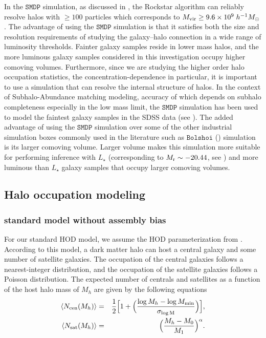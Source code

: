 \documentclass[12pt, preprint]{aastex}
\begin{document}
In the $\mathtt{SMDP}$ simulation, as discussed in \citet{halodemographic}, the Rockstar algorithm can reliably resolve halos with $\geq 100$ particles which corresponds to $M_{\rm vir} \geq 9.6 \times 10^{9} \; h^{-1}M_{\odot}$. The advantage of using the $\mathtt{SMDP}$ simulation is that it satisfies both the size and resolution requirements of studying the galaxy--halo connection in a wide range of luminosity thresholds. Fainter galaxy samples reside in lower mass halos, and the more luminous galaxy samples considered in this investigation occupy higher comoving volumes. Furthermore, since we are studying the higher order halo occupation statistics, the concentration-dependence in particular, it is important to use a simulation that can resolve the internal structure of halos. In the context of Subhalo-Abundance matching modeling, accuracy of which depends on subhalo completeness especially in the low mass limit, the $\mathtt{SMDP}$ simulation has been used to model the faintest galaxy samples in the SDSS data (see \citet{hod_vs_sham}). The added advantage of using the $\mathtt{SMDP}$ simulation over some of the other industrial simulation boxes commonly used in the literature such as $\mathtt{Bolshoi}$ (\citealt{Klypin2011,smallmultidark}) simulation is its larger comoving volume. Larger volume makes this simulation more suitable for performing inference with $L_{\star}$ (corresponding to $M_{\rm r} \sim -20.44$, see \citealt{blanton2003}) and more luminous than $L_{\star}$ galaxy samples that occupy larger comoving volumes.

\subsection{Halo occupation modeling}
\subsubsection{standard model without assembly bias}\label{subsubsec:hod}

For our standard HOD model, we assume the HOD parameterization from \citet{zheng07}. 
According to this model, a dark matter halo can host a central galaxy and some number of satellite galaxies. The occupation of the central galaxies follows a nearest-integer distribution, 
and the occupation of the satellite galaxies follows a Poisson distribution. The expected number of centrals and satellites as a function of the host halo mass of $M_{h}$ are given by the following equations 
\begin{eqnarray}
\langle N_{\rm cen}(M_{h}) \rangle &=& \frac{1}{2}\Big[1+\Big(\frac{\log M_{h} - \log M_{\rm min}}{\sigma_{\log \rm{M}}} \Big) \Big], \label{hod:central}\\ 
\langle N_{\rm sat}(M_{h}) \rangle &=& \Big( \frac{M_{h} - M_{\rm{0}}}{M_{\rm 1}} \Big)^{\alpha}. \label{hod:satellite}
\end{eqnarray}
\end{document}
